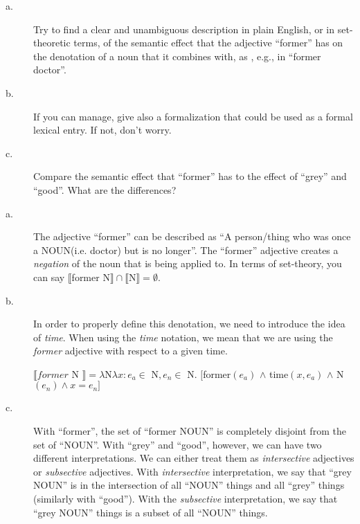 \documentclass[11pt]{article}
\begin{document}
\vspace*{0.5cm}

\begin{problem}{3}
\begin{description}
    \item[a.] Try to find a clear and unambiguous description in plain English, or in set-theoretic terms, of the semantic effect that the adjective ``former'' has on the denotation of a noun that it combines with, as , e.g., in ``former doctor''.

    \item[b.] If you can manage, give also a formalization that could be used as a formal lexical entry. If not, don't worry.

    \item[c.] Compare the semantic effect that ``former'' has to the effect of ``grey'' and ``good''. What are the differences?
\end{description}
\end{problem}

\begin{solution}
\begin{description}
    \item[a.] The adjective ``former'' can be described as ``A person/thing who was once a NOUN(i.e. doctor) but is no longer''.  The ``former'' adjective creates a \textit{negation} of the noun that is being applied to.  In terms of set-theory, you can say $\llbracket$former N$\rrbracket \cap$$\llbracket$N$\rrbracket = \emptyset$. 

    \item[b.] In order to properly define this denotation, we need to introduce the idea of \textit{time}.  When using the \textit{time} notation, we mean that we are using the \textit{former} adjective with respect to a given time.

     $\llbracket former$ N $\rrbracket = \lambda $N$ \lambda x:  e_{a} \in $ N$, e_{n} \in $ N. $ [ $former$(e_{a})$ $\wedge$ time$(x, e_{a})$ $\wedge$ N$(e_{n}) \wedge x = e_{n}]$


    \item[c.]  With ``former'', the set of ``former NOUN'' is completely disjoint from the set of ``NOUN''.  With ``grey'' and ``good'', however, we can have two different interpretations.  We can either treat them as \textit{intersective} adjectives or \textit{subsective} adjectives.  With \textit{intersective} interpretation, we say that ``grey NOUN'' is in the intersection of all ``NOUN'' things and all ``grey'' things (similarly with ``good'').  With the \textit{subsective} interpretation, we say that ``grey NOUN'' things is a subset of all ``NOUN'' things.
     
\end{description}
\end{solution}
\end{document}
